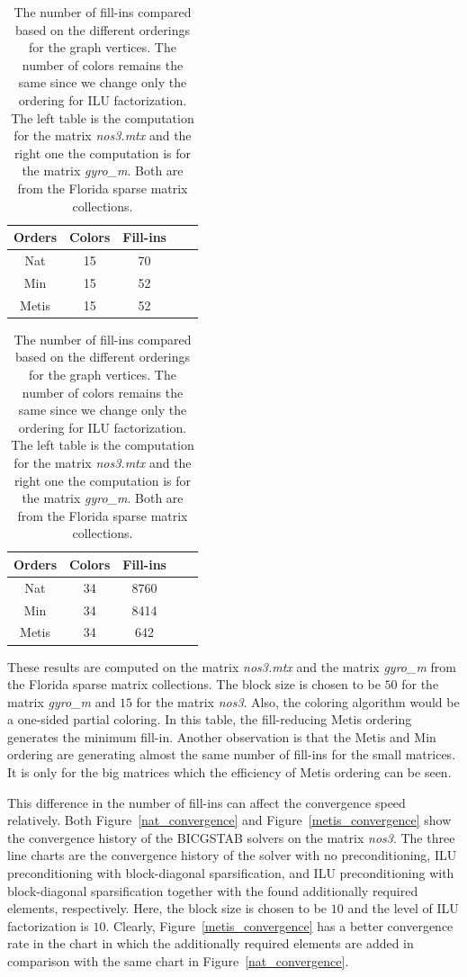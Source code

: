 \documentclass[11pt, twoside,a4paper]{book}
\begin{document}
\begin{table}
\begin{tabular}{|c|c|c|c|c|}
\hline
Orders & Colors & Fill-ins\\\hline
Nat & 15 & 70\\\hline
Min & 15 & 52\\\hline
Metis & 15 & 52\\\hline
\end{tabular}
\hfill
\begin{tabular}{|c|c|c|c|c|}
\hline
Orders & Colors & Fill-ins \\\hline
Nat & 34 & 8760 \\\hline
Min & 34 & 8414 \\\hline
Metis & 34 & 642\\\hline
\end{tabular}
\caption{The number of fill-ins compared based on the different orderings
for the graph vertices. The number of colors remains the same since we change only the ordering for
ILU factorization.
The left table is the computation for the matrix \textit{nos3.mtx}
and the right one the computation is for the matrix \textit{gyro\_m}.
Both are from the Florida sparse matrix collections.}
\label{ilu-effect}
\end{table}

These results are computed on the matrix \textit{nos3.mtx}
and the matrix \textit{gyro\_m} from
the Florida sparse matrix collections. The block size is
chosen to be $50$ for the matrix \textit{gyro\_m} and $15$ for
the matrix \textit{nos3}. Also, the coloring algorithm would be a one-sided
partial coloring. In this table, the fill-reducing Metis ordering
generates the minimum fill-in.
Another observation is that the Metis and Min ordering are generating almost the same
number of fill-ins for the small matrices.
It is only for the big matrices which the efficiency of Metis ordering can be seen.

This difference in the number of fill-ins can affect the convergence speed
relatively. Both Figure~\ref{nat_convergence}
and Figure~\ref{metis_convergence} show
the convergence history of the BICGSTAB solvers on the matrix \textit{nos3}.
The three line charts are the convergence history of the solver with
no preconditioning, ILU preconditioning with block-diagonal sparsification,
and ILU preconditioning with block-diagonal sparsification together with the found
additionally required elements, respectively.
Here, the block size is chosen to be $10$ and the level of ILU factorization
is $10$.
Clearly, Figure~\ref{metis_convergence} has a better convergence rate in the chart
in which the additionally required elements are added in comparison with the same
chart in Figure~\ref{nat_convergence}.
\end{document}
